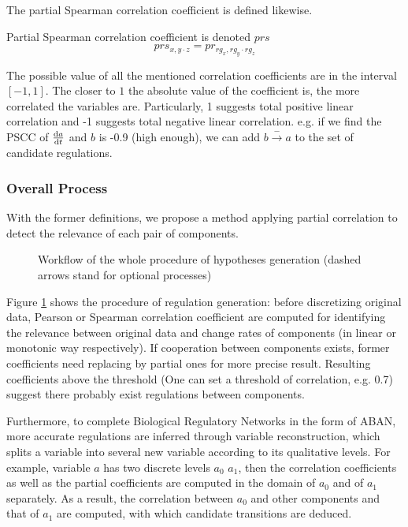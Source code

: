 The partial Spearman correlation coefficient is defined likewise.
\begin{definition}Partial Spearman correlation coefficient is denoted $prs$
    $$prs_{x,y\cdot z}=pr_{rg_x,rg_y\cdot rg_z}$$%
\end{definition}

The possible value of all the mentioned correlation coefficients are in the interval $[-1,1]$.
The closer to $1$ the absolute value of the coefficient is, the more correlated the variables are.
Particularly, 1 suggests total positive linear correlation and -1 suggests total negative linear correlation. 
e.g. if we find the PSCC of $\frac{{\rm d}a}{{\rm d}t}$ and $b$ is -0.9 (high enough), we can add $b\xrightarrow{-}a$ to the set of candidate regulations.

\subsubsection{Overall Process}

With the former definitions, we propose a method applying partial correlation to detect the relevance of each pair of components.

\begin{figure}[ht]

\caption[Workflow of model inference via partial correlation]{Workflow of the whole procedure of hypotheses generation (dashed arrows stand for optional processes)}\label{plan}
\end{figure}
Figure \ref{plan} shows the procedure of regulation generation: before discretizing original data, Pearson or Spearman correlation coefficient \cite{samaga2009logic,hauke2011comparison} are computed for identifying the relevance between original data and change rates of components (in linear or monotonic way respectively). If cooperation between components exists, former coefficients need replacing by partial ones \cite{de2004discovery} for more precise result.
Resulting coefficients above the threshold (One can set a threshold of correlation, e.g. 0.7) suggest there probably exist regulations between components.

Furthermore, to complete Biological Regulatory Networks in the form of ABAN, more accurate regulations are inferred through variable reconstruction, which splits a variable into several new variable according to its qualitative levels.
For example, variable $a$ has two discrete levels $a_0$ $a_1$, then the correlation coefficients as well as the partial coefficients are computed in the domain of $a_0$ and of $a_1$ separately.
As a result, the correlation between $a_0$ and other components and that of $a_1$ are computed, with which candidate transitions are deduced.

